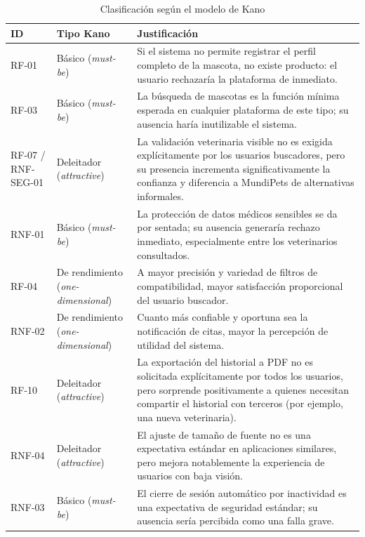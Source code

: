\documentclass[journal,onecolumn]{IEEEtran}
\begin{document}
\begin{table}[H]
\caption{Clasificación según el modelo de Kano}
\label{tab:kano}
\begin{tabularx}{\textwidth}{|l|l|X|}
\hline
\textbf{ID} & \textbf{Tipo Kano} & \textbf{Justificación} \\
\hline
RF-01 & Básico (\textit{must-be}) & Si el sistema no permite registrar el perfil completo de la mascota, no existe producto: el usuario rechazaría la plataforma de inmediato. \\
\hline
RF-03 & Básico (\textit{must-be}) & La búsqueda de mascotas es la función mínima esperada en cualquier plataforma de este tipo; su ausencia haría inutilizable el sistema. \\
\hline
RF-07 / RNF-SEG-01 & Deleitador (\textit{attractive}) & La validación veterinaria visible no es exigida explícitamente por los usuarios buscadores, pero su presencia incrementa significativamente la confianza y diferencia a MundiPets de alternativas informales. \\
\hline
RNF-01 & Básico (\textit{must-be}) & La protección de datos médicos sensibles se da por sentada; su ausencia generaría rechazo inmediato, especialmente entre los veterinarios consultados. \\
\hline
RF-04 & De rendimiento (\textit{one-dimensional}) & A mayor precisión y variedad de filtros de compatibilidad, mayor satisfacción proporcional del usuario buscador. \\
\hline
RNF-02 & De rendimiento (\textit{one-dimensional}) & Cuanto más confiable y oportuna sea la notificación de citas, mayor la percepción de utilidad del sistema. \\
\hline
RF-10 & Deleitador (\textit{attractive}) & La exportación del historial a PDF no es solicitada explícitamente por todos los usuarios, pero sorprende positivamente a quienes necesitan compartir el historial con terceros (por ejemplo, una nueva veterinaria). \\
\hline
RNF-04 & Deleitador (\textit{attractive}) & El ajuste de tamaño de fuente no es una expectativa estándar en aplicaciones similares, pero mejora notablemente la experiencia de usuarios con baja visión. \\
\hline
RNF-03 & Básico (\textit{must-be}) & El cierre de sesión automático por inactividad es una expectativa de seguridad estándar; su ausencia sería percibida como una falla grave. \\
\hline
\end{tabularx}
\end{table}
\end{document}
